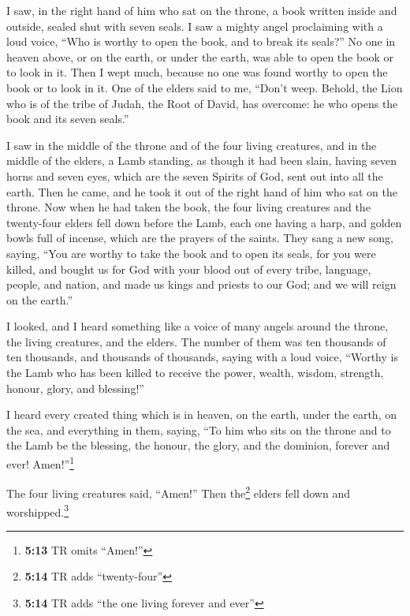  I saw, in the right hand of him who sat on the throne, a
book written inside and outside, sealed shut with seven seals.
 I saw a mighty angel proclaiming with a loud voice, ``Who
is worthy to open the book, and to break its seals?''  No
one in heaven above, or on the earth, or under the earth, was able to
open the book or to look in it.  Then I wept much, because
no one was found worthy to open the book or to look in it.
 One of the elders said to me, ``Don't weep. Behold, the
Lion who is of the tribe of Judah, the Root of David, has overcome: he
who opens the book and its seven seals.''

 I saw in the middle of the throne and of the four living
creatures, and in the middle of the elders, a Lamb standing, as though
it had been slain, having seven horns and seven eyes, which are the
seven Spirits of God, sent out into all the earth.  Then
he came, and he took it out of the right hand of him who sat on the
throne.  Now when he had taken the book, the four living
creatures and the twenty-four elders fell down before the Lamb, each one
having a harp, and golden bowls full of incense, which are the prayers
of the saints.  They sang a new song, saying, ``You are
worthy to take the book and to open its seals, for you were killed, and
bought us for God with your blood out of every tribe, language, people,
and nation,  and made us kings and priests to our God;
and we will reign on the earth.''

 I looked, and I heard something like a voice of many
angels around the throne, the living creatures, and the elders. The
number of them was ten thousands of ten thousands, and thousands of
thousands,  saying with a loud voice, ``Worthy is the
Lamb who has been killed to receive the power, wealth, wisdom, strength,
honour, glory, and blessing!''

 I heard every created thing which is in heaven, on the
earth, under the earth, on the sea, and everything in them, saying, ``To
him who sits on the throne and to the Lamb be the blessing, the honour,
the glory, and the dominion, forever and ever! Amen!''\footnote{\textbf{5:13}
  TR omits ``Amen!''}

 The four living creatures said, ``Amen!'' Then
the\footnote{\textbf{5:14} TR adds ``twenty-four''} elders fell down and
worshipped.\footnote{\textbf{5:14} TR adds ``the one living forever and
  ever''}

